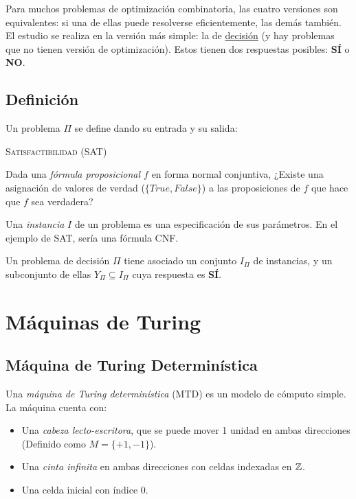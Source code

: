 Para muchos problemas de optimización combinatoria, las cuatro versiones son equivalentes: si una de ellas puede resolverse eficientemente, las demás también. El estudio se realiza en la versión más simple: la de \underline{decisión} (y hay problemas que no tienen versión de optimización). Estos tienen dos respuestas posibles: \textbf{SÍ} o \textbf{NO}.

\subsection{Definición}

Un problema $\Pi$ se define dando su entrada y su salida:
\begin{problema}
    \textsc{Satisfactibilidad (SAT)}
    \medskip

    Dada una \textit{fórmula proposicional $f$} en forma normal conjuntiva, ¿Existe una asignación de valores de verdad ($\{True, False\}$) a las proposiciones de $f$ que hace que $f$ sea verdadera?
\end{problema}

Una \textit{instancia} $I$ de un problema es una especificación de sus parámetros. En el ejemplo de SAT, sería una fórmula CNF.

Un problema de decisión $\Pi$ tiene asociado un conjunto $I_{\Pi}$ de instancias, y un subconjunto de ellas $Y_{\Pi} \subseteq I_{\Pi}$ cuya respuesta es \textbf{SÍ}.

\section{Máquinas de Turing}

\subsection{Máquina de Turing Determinística}

Una \textit{máquina de Turing determinística} (MTD) es un modelo de cómputo simple. La máquina cuenta con:
\begin{itemize}
    \item Una \textit{cabeza lecto-escritora}, que se puede mover 1 unidad en ambas direcciones (Definido como $M = \{+1, -1\}$).
    \item Una \textit{cinta infinita} en ambas direcciones con celdas indexadas en $\mathbb{Z}$.
    \item Una celda inicial con índice $0$.
\end{itemize}

